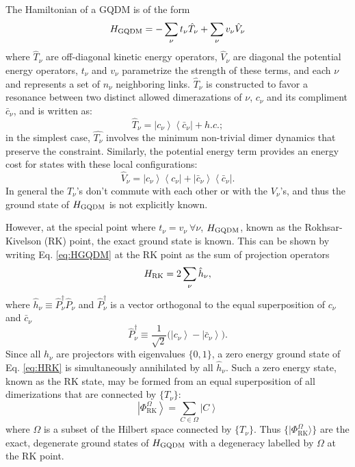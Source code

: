 \documentclass[twocolumn,prb,aps,floatfix,superscriptaddress]{revtex4-1}
\newcommand{\ket}[1]{| #1 \rangle}
\newcommand{\eket}[1]{\left | #1 \right \rangle}
\newcommand{\ebra}[1]{\left \langle #1 \right |}
\newcommand{\Eqref}[1]{Eq. \eqref{#1}}
\newcommand{\RK}{\mathrm{RK}}
\begin{document}
The Hamiltonian of a GQDM is of the form
\begin{equation}
H_{\rm{GQDM}} = -\sum_\nu t_\nu \hat{T}_{\nu} + \sum_\nu v_\nu \hat{V}_{\nu} \label{eq:HGQDM}
\end{equation}
where $\hat{T}_\nu$ are off-diagonal kinetic energy operators, $\hat{V}_\nu$ are diagonal the potential energy operators, $t_\nu$ and $v_\nu$ parametrize the strength of these terms, and each $\nu$ and represents a set of $n_\nu$ neighboring links. $\hat{T}_\nu$ is constructed to favor a resonance between two distinct allowed dimerazations of $\nu$, $c_\nu$ and its compliment $\bar{c}_\nu$, and is written as:
\begin{equation}
\hat{T}_{\nu} = \eket{c_\nu}\ebra{\bar{c}_\nu} + h.c.;
\end{equation}
in the simplest case, $\hat{T_\nu}$ involves the minimum non-trivial dimer dynamics that preserve the constraint. Similarly, the potential energy term provides an energy cost for states with these local configurations:
\begin{equation}
\hat{V}_{\nu} = \eket{c_\nu}\ebra{c_\nu} +  \eket{\bar{c}_\nu}\ebra{\bar{c}_\nu}.
\end{equation}
In general the $T_\nu$'s don't commute with each other or with the $V_\nu$'s, and thus the ground state of $H_{\rm{GQDM}}$ is not explicitly known.

However, at the special point where $t_\nu = v_\nu~\forall \nu$, $H_{\rm{GQDM}}$, known as the Rokhsar-Kivelson (RK) point, the exact ground state is known. This can be shown by writing \Eqref{eq:HGQDM} at the RK point as the sum of projection operators
\begin{equation}
H_{\rm{RK}} = 2 \sum_\nu \hat{h}_\nu \label{eq:HRK},
\end{equation}
where $\hat{h}_\nu \equiv \hat{P}^\dagger_{\nu} \hat{P}_{\nu}$ and $\hat{P}^\dagger_\nu$ is a vector orthogonal to the equal superposition of $c_\nu$ and $\bar{c}_\nu$
\begin{equation}
\hat{P}^\dagger_\nu \equiv \frac{1}{\sqrt{2}} \biggl( \eket{ c_\nu} - \eket{\bar{c}_\nu} \biggr).
\end{equation} 
Since all $h_\nu$ are projectors with eigenvalues $\{0,1\}$, a zero energy ground state of \Eqref{eq:HRK} is simultaneously annihilated by all $\hat{h}_\nu$. Such a zero energy state, known as the RK state, may be formed from an equal superposition of all dimerizations that are connected by $\{T_\nu\}$:
\begin{equation}
\eket{\Phi_{\RK}^{\Omega}} = \sum_{C \in \Omega} \eket{C}
\end{equation} 
where $\Omega$ is a subset of the Hilbert space connected by $\{T_\nu\}$. Thus $\{ \ket{\Phi_{\RK}^\Omega} \}$ are the exact, degenerate ground states of $H_{\rm{GQDM}}$ with a degeneracy labelled by $\Omega$ at the RK point.
\end{document}
